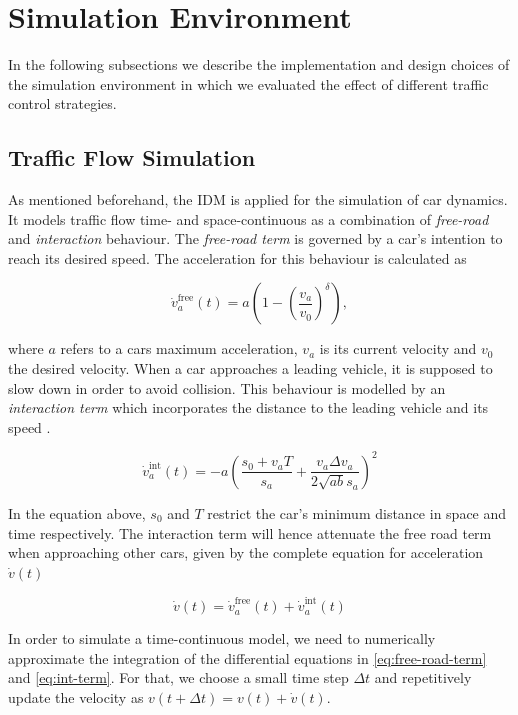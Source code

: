 \documentclass[11pt]{article}
\begin{document}
\section{Simulation Environment}
\label{sec:envi}
In the following subsections we describe the implementation and design choices of the simulation environment in which we evaluated the effect of different traffic control strategies.
	
\subsection{Traffic Flow Simulation}
As mentioned beforehand, the IDM \citep{treiber2000congested} is applied for the simulation of car dynamics. It models traffic flow time- and space-continuous as a combination of \textit{free-road} and \textit{interaction} behaviour. The \textit{free-road term} is governed by a car's intention to reach its desired speed. The acceleration for this behaviour is calculated \citep{treiber2000congested} as

\begin{equation}
	\label{eq:free-road-term}
	\dot{v}_a^{\mathrm{free}}(t) = a ( 1 - ( \frac{v_a}{v_0} )^\delta),
\end{equation}

where $a$ refers to a cars maximum acceleration, $v_a$ is its current velocity and $v_0$ the desired velocity. When a car approaches a leading vehicle, it is supposed to slow down in order to avoid collision. This behaviour is modelled by an \textit{interaction term} which incorporates the distance to the leading vehicle and its speed \citep{treiber2000congested}. 

\begin{equation}
	\label{eq:int-term}
	\dot{v}_a^{\mathrm{int}}(t) = - a ( \frac{s_0 + v_a T}{s_a} + \frac{v_a \Delta v_a}{2 \sqrt{ab} s_a} )^2
\end{equation}

In the equation above, $s_0$ and $T$ restrict the car's minimum distance in space and time respectively. The interaction term will hence attenuate the free road term when approaching other cars, given by the complete equation for acceleration $\dot{v}(t)$

\begin{equation}
	\dot{v}(t) = \dot{v}_a^{\mathrm{free}}(t) + \dot{v}_a^{\mathrm{int}}(t)
\end{equation}

In order to simulate a time-continuous model, we need to numerically approximate the integration of the differential equations in \ref{eq:free-road-term} and \ref{eq:int-term}. For that, we choose a small time step $\Delta t$ and repetitively update the velocity as $v(t + \Delta t) = v(t) + \dot{v}(t)$.
\end{document}

